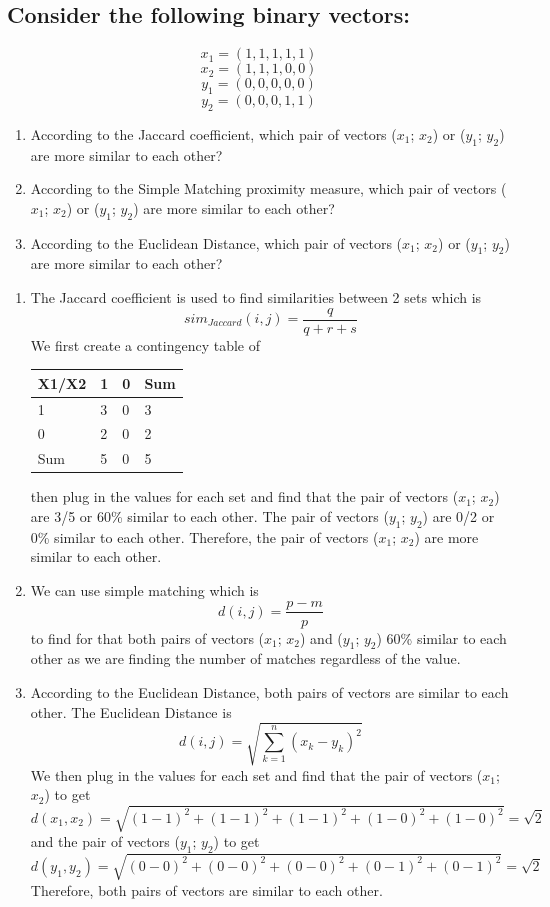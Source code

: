 \documentclass{article}
\begin{document}
\subsection*{Consider the following binary vectors:}
\[x_1 = (1,1,1,1,1)\]
\[x_2 = (1,1,1,0,0)\]
\[y_1 = (0,0,0,0,0)\]
\[y_2 = (0,0,0,1,1)\]

\begin{enumerate}
    \item According to the Jaccard coefficient, which pair of vectors ($x_1$; $x_2$) or ($y_1$; $y_2$) are more similar to each other?
    \item According to the Simple Matching proximity measure, which pair of vectors ($x_1$; $x_2$) or ($y_1$; $y_2$) are more similar to each other?
    \item According to the Euclidean Distance, which pair of vectors ($x_1$; $x_2$) or ($y_1$; $y_2$) are more similar to each other?
\end{enumerate}

\begin{enumerate}
    \item The Jaccard coefficient is used to find similarities between 2 sets which is \[sim_{Jaccard}(i,j) = \frac{q}{q+r+s}\] We first create a contingency table of 
    \begin{table}[h]
        \begin{tabular}{|l|l|l|l|}
        \hline
        X1/X2 & 1 & 0 & Sum \\ \hline
        1 & 3 & 0 & 3 \\ \hline
        0 & 2 & 0 & 2 \\ \hline
        Sum & 5 & 0 & 5 \\ \hline
        \end{tabular}
        \centering
    \end{table} 
    then plug in the values for each set and find that the pair of vectors ($x_1$; $x_2$) are 3/5 or 60\% similar to each other. The pair of vectors ($y_1$; $y_2$) are 0/2 or 0\% similar to each other. Therefore, the pair of vectors ($x_1$; $x_2$) are more similar to each other.
    \item We can use simple matching which is \[d(i,j) = \frac{p - m}{p}\]
    to find for that both pairs of vectors ($x_1$; $x_2$) and ($y_1$; $y_2$) 60\% similar to each other as we are finding the number of matches regardless of the value.
    \item According to the Euclidean Distance, both pairs of vectors are similar to each other. The Euclidean Distance is \[d(i,j) = \sqrt{\sum_{k=1}^n (x_k - y_k)^2}\] We then plug in the values for each set and find that the pair of vectors ($x_1$; $x_2$) to get \[d(x_1,x_2) = \sqrt{(1-1)^2 + (1-1)^2 + (1-1)^2 + (1-0)^2 + (1-0)^2} = \sqrt{2}\] and the pair of vectors ($y_1$; $y_2$) to get \[d(y_1,y_2) = \sqrt{(0-0)^2 + (0-0)^2 + (0-0)^2 + (0-1)^2 + (0-1)^2} = \sqrt{2}\] Therefore, both pairs of vectors are similar to each other.
\end{enumerate}
\end{document}
